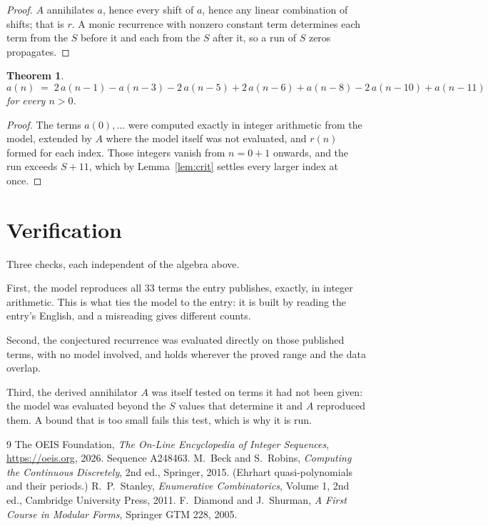 \documentclass[11pt,a4paper]{article}
\theoremstyle{plain}
\newtheorem{theorem}{Theorem}
\theoremstyle{definition}
\begin{document}
\begin{proof}
$A$ annihilates $a$, hence every shift of $a$, hence any linear combination of shifts; that is
$r$. A monic recurrence with nonzero constant term determines each term from the $S$ before it
and each from the $S$ after it, so a run of $S$ zeros propagates.
\end{proof}

\begin{theorem}
\[
a(n)\;=\;2\,a(n-1) - a(n-3) - 2\,a(n-5) + 2\,a(n-6) + a(n-8) - 2\,a(n-10) + a(n-11)
\]
for every $n>0$.
\end{theorem}

\begin{proof}
The terms $a(0),\dots$ were computed exactly in integer arithmetic from the model, extended by
$A$ where the model itself was not evaluated, and $r(n)$ formed for each index. Those integers
vanish from $n=0+1$ onwards, and the run exceeds $S+11$, which by
Lemma~\ref{lem:crit} settles every larger index at once.
\end{proof}

\section{Verification}

Three checks, each independent of the algebra above.

First, the model reproduces all $33$ terms the entry publishes, exactly, in integer
arithmetic. This is what ties the model to the entry: it is built by reading the entry's
English, and a misreading gives different counts.

Second, the conjectured recurrence was evaluated directly on those published terms, with no
model involved, and holds wherever the proved range and the data overlap.

Third, the derived annihilator $A$ was itself tested on terms it had not been given: the model
was evaluated beyond the $S$ values that determine it and $A$ reproduced them. A bound that is
too small fails this test, which is why it is run.

\begin{thebibliography}{9}
 The OEIS Foundation, \emph{The On-Line Encyclopedia of Integer
Sequences}, \url{https://oeis.org}, 2026. Sequence A248463.
 M.~Beck and S.~Robins, \emph{Computing the Continuous Discretely},
2nd ed., Springer, 2015. (Ehrhart quasi-polynomials and their periods.)
 R.~P.~Stanley, \emph{Enumerative Combinatorics}, Volume 1, 2nd ed.,
Cambridge University Press, 2011.
 F.~Diamond and J.~Shurman, \emph{A First Course in Modular Forms},
Springer GTM 228, 2005.
\end{thebibliography}
\end{document}
